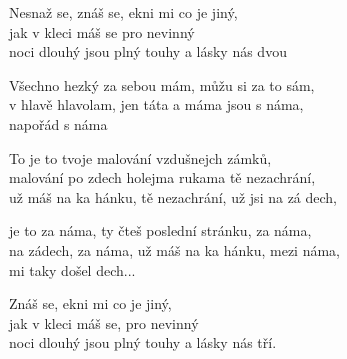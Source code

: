 
\ve{}
Nesnaž se, znáš se, ekni mi  co je jiný,\\
jak v kleci máš se pro nevinný \\
noci dlouhý jsou plný  touhy a lásky nás dvou 

\ve{}
Všechno hezký za sebou mám,
můžu si  za to sám, \\
v hlavě  hlavolam, jen táta a máma jsou s  náma, \\
napořád s náma

\ve{}
To  je to tvoje malování vzdušnejch zámků,\\
malování po zdech holejma  rukama tě nezachrání, \\
už máš na ka hánku, tě nezachrání, už jsi na zá dech,

\ve{}
je to za náma, ty čteš poslední  stránku, za náma,\\
na  zádech, za náma, už máš na ka hánku, mezi náma,\\
mi taky došel dech...

\ve{}
Znáš se, ekni mi  co je jiný,\\
jak v kleci máš se, pro nevinný\\
noci dlouhý jsou plný touhy a lásky nás tří.



\esong{}
